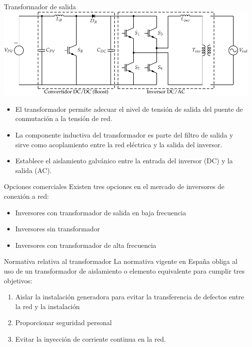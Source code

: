 \documentclass[xcolor={usenames,svgnames,dvipsnames}]{beamer}
\begin{document}
\begin{frame}[label=sec-2-5-4]{Transformador de salida}
\includegraphics[width=.9\linewidth]{../figs/InversorPV.pdf}

\begin{itemize}
\item El transformador permite adecuar el nivel de tensión de salida del
puente de conmutación a la tensión de red.

\item La componente inductiva del transformador es parte del filtro de
salida y sirve como acoplamiento entre la red eléctrica y la salida
del inversor.

\item Establece el aislamiento galvánico entre la entrada del inversor (DC)
y la salida (AC).
\end{itemize}
\end{frame}

\begin{frame}[label=sec-2-5-5]{Opciones comerciales}
Existen tres opciones en el mercado de inversores de conexión a red:

\begin{itemize}
\item Inversores con transformador de salida en baja frecuencia

\item Inversores sin transformador

\item Inversores con transformador de alta frecuencia
\end{itemize}
\end{frame}

\begin{frame}[label=sec-2-5-6]{Normativa relativa al transformador}
La normativa vigente en España obliga al uso de un transformador de aislamiento o elemento equivalente para cumplir tres objetivos:

\begin{enumerate}
\item Aislar la instalación generadora para evitar la transferencia de defectos entre la red y la instalación

\item Proporcionar seguridad personal

\item Evitar la inyección de corriente continua en la red.
\end{enumerate}
\end{frame}
\end{document}
